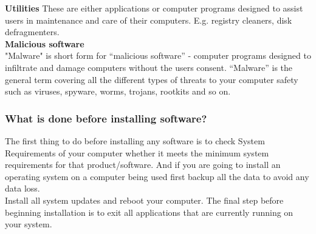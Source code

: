 \textbf{Utilities}
These are either applications or computer programs designed to assist users in maintenance and care of their computers. E.g. registry cleaners, disk defragmenters.\\
\textbf{Malicious software}\\
"Malware" is short form for “malicious software” - computer programs designed to infiltrate and damage computers without the users consent. “Malware” is the general term covering all the different types of threats to your computer safety such as viruses, spyware, worms, trojans, rootkits and so on. 

\subsubsection{What is done before installing software?}
The first thing to do before installing any software is to check System Requirements of your computer whether it meets the minimum system requirements for that product/​​software.  And if you are going to install an operating system on a computer being used first backup all the data to avoid any data loss. \\
Install all system updates and reboot your computer. The final step before beginning installation is to exit all applications that are currently running on your system.

